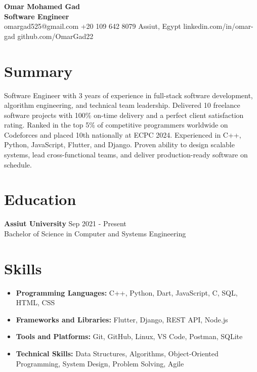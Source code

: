 \documentclass[letterpaper,10pt]{article}
\begin{document}
\pagestyle{empty}

{\LARGE\bfseries Omar Mohamed Gad}\\[3pt]
{\large\bfseries Software Engineer}\\[5pt]
{\small
  omargad525@gmail.com \hspace{6pt}\textbar\hspace{6pt}
  +20 109 642 8079 \hspace{6pt}\textbar\hspace{6pt}
  Assiut, Egypt \hspace{6pt}\textbar\hspace{6pt}
  linkedin.com/in/omar-gad \hspace{6pt}\textbar\hspace{6pt}
  github.com/OmarGad22
}

\bigskip

\section{Summary}

Software Engineer with 3 years of experience in full-stack software development, algorithm engineering, and technical team leadership. Delivered 10 freelance software projects with 100\% on-time delivery and a perfect client satisfaction rating. Ranked in the top 5\% of competitive programmers worldwide on Codeforces and placed 10th nationally at ECPC 2024. Experienced in C++, Python, JavaScript, Flutter, and Django. Proven ability to design scalable systems, lead cross-functional teams, and deliver production-ready software on schedule.

\section{Education}

\textbf{Assiut University} \hfill Sep 2021 - Present\\
Bachelor of Science in Computer and Systems Engineering

\section{Skills}

\begin{itemize}
  \item \textbf{Programming Languages:} C++, Python, Dart, JavaScript, C, SQL, HTML, CSS
  \item \textbf{Frameworks and Libraries:} Flutter, Django, REST API, Node.js
  \item \textbf{Tools and Platforms:} Git, GitHub, Linux, VS Code, Postman, SQLite
  \item \textbf{Technical Skills:} Data Structures, Algorithms, Object-Oriented Programming, System Design, Problem Solving, Agile
\end{itemize}
\end{document}
